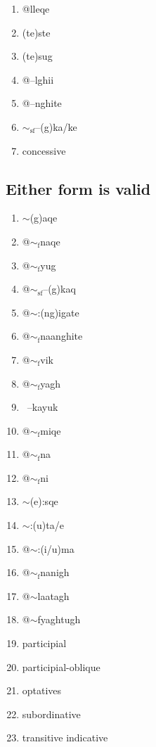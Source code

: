 \documentclass{article}
\begin{document}
\begin{enumerate}
\item @lleqe
\item (te)ste
\item (te)sug
\item @--lghii
\item @--nghite
\item $\sim_\text{sf}$--(g)ka/ke
\item concessive
\end{enumerate}


\subsection{Either form is valid}

\begin{enumerate}
\item $\sim$(g)aqe
\item @$\sim_\text{f}$naqe
\item @$\sim_\text{f}$yug
\item @$\sim_\text{sf}$--(g)kaq
\item @$\sim$:(ng)igate
\item @$\sim_\text{f}$naanghite
\item @$\sim_\text{f}$vik
\item @$\sim_\text{f}$yagh
\item ~--kayuk
\item @$\sim_\text{f}$miqe
\item @$\sim_\text{f}$na
\item @$\sim_\text{f}$ni
\item $\sim$(e):sqe
\item $\sim$:(u)ta/e
\item @$\sim$:(i/u)ma
\item @$\sim_\text{f}$nanigh
\item @$\sim$laatagh
\item @$\sim$fyaghtugh
\item participial
\item participial-oblique
\item optatives
\item subordinative
\item transitive indicative
\end{enumerate}
\end{document}
